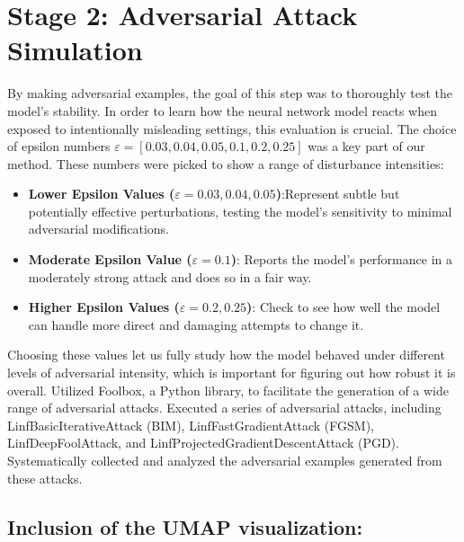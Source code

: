 \documentclass[10pt, conference, a4paper, final]{IEEEtran}
\begin{document}
\section{Stage 2: Adversarial Attack Simulation}

By making adversarial examples, the goal of this step was to thoroughly test the model's stability. In order to learn how the neural 
network model reacts when exposed to intentionally misleading settings, this evaluation is crucial.
The choice of epsilon numbers \( \varepsilon = [0.03,0.04,0.05,0.1, 0.2, 0.25] \) was a key part of our method. These numbers were 
picked to show a range of disturbance intensities:
\begin{itemize}
    \item \textbf{Lower Epsilon Values (\( \varepsilon = 0.03, 0.04, 0.05 \))}:Represent subtle but potentially effective perturbations, 
    testing the model's sensitivity to minimal adversarial modifications.
    
    \item \textbf{Moderate Epsilon Value (\( \varepsilon = 0.1 \))}: Reports the model's performance in a moderately strong attack and 
    does so in a fair way.
    \item \textbf{Higher Epsilon Values (\( \varepsilon = 0.2, 0.25 \))}: Check to see how well the model can handle more direct and 
    damaging attempts to change it.
\end{itemize}

Choosing these values let us fully study how the model behaved under different levels of adversarial intensity, which is important for 
figuring out how robust it is overall. Utilized Foolbox, a Python library, to facilitate the generation of a wide range of adversarial attacks.
Executed a series of adversarial attacks, including LinfBasicIterativeAttack (BIM), LinfFastGradientAttack (FGSM), LinfDeepFoolAttack, 
and LinfProjectedGradientDescentAttack (PGD). Systematically collected and analyzed the adversarial examples generated from these attacks.


\subsection{Inclusion of the UMAP visualization:}
\end{document}
